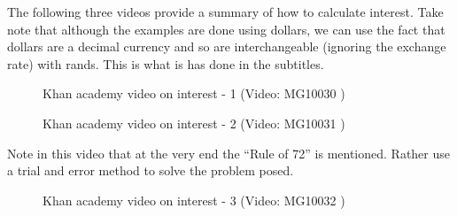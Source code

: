 The following three videos provide a summary of how to calculate interest. Take note that although the examples are done using dollars, we can use the fact that dollars are a decimal currency and so are interchangeable (ignoring the exchange rate) with rands. This is what is has done in the subtitles.\par 

\begin{figure}[H]
    \textnormal{Khan academy video on interest - 1}
    \vspace{.1in}
    \nopagebreak
     { (Video:  MG10030 )}
 \end{figure}

\begin{figure}[H] %
    \textnormal{Khan academy video on interest - 2}
    \vspace{.1in}
    \nopagebreak
     { (Video:  MG10031 )}
\end{figure}

Note in this video that at the very end the ``Rule of 72'' is mentioned. Rather use a trial and error method to solve the problem posed.

\begin{figure}[H] %
    \textnormal{Khan academy video on interest - 3}
    \vspace{.1in}
    \nopagebreak
     { (Video:  MG10032 )}
\end{figure}


